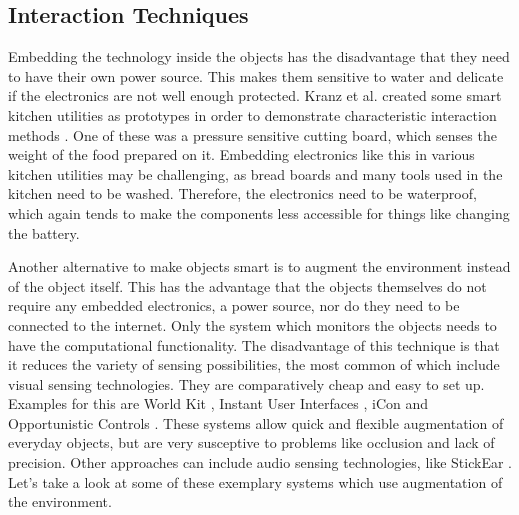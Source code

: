 \subsection{Interaction Techniques}
Embedding the technology inside the objects has the disadvantage that they need to have their own power source.
This makes them sensitive to water and delicate if the electronics are not well enough protected.
Kranz et al. created some smart kitchen utilities as prototypes in order to demonstrate characteristic interaction methods \cite{kranz10}. 
One of these was a pressure sensitive cutting board, which senses the weight of the food prepared on it. 
Embedding electronics like this in various kitchen utilities may be challenging, as bread boards and many tools used in the kitchen need to be washed. 
Therefore, the electronics need to be waterproof, which again tends to make the components less accessible for things like changing the battery.

Another alternative to make objects smart is to augment the environment instead of the object itself. 
This has the advantage that the objects themselves do not require any embedded electronics, a power source, nor do they need to be connected to the internet. 
Only the system which monitors the objects needs to have the computational functionality. 
The disadvantage of this technique is that it reduces the variety of sensing possibilities, the most common of which include visual sensing technologies. 
They are comparatively cheap and easy to set up. 
Examples for this are World Kit \cite{xiao13}, Instant User Interfaces \cite{corsten13}, iCon \cite{cheng10} and Opportunistic Controls \cite{henderson08}. 
These systems allow quick and flexible augmentation of everyday objects, but are very susceptive to problems like occlusion and lack of precision.
Other approaches can include audio sensing technologies, like StickEar \cite{yeo13}. Let's take a look at some of these exemplary systems which use augmentation of the environment.

